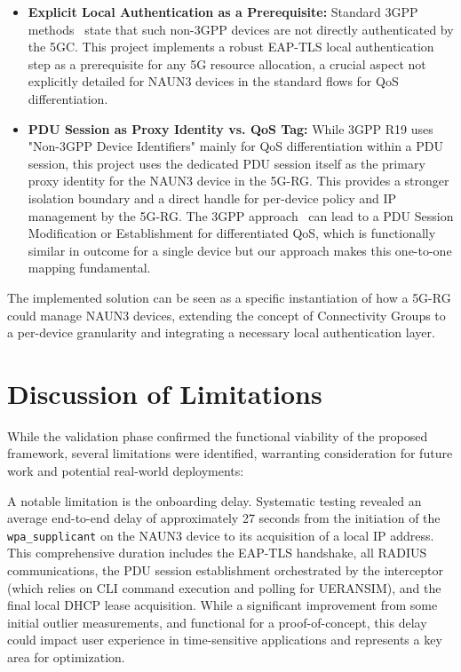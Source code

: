 \begin{itemize}
    \item \textbf{Explicit Local Authentication as a Prerequisite:} Standard \ac{3GPP} methods~\cite{23.501-p564} state that such non-\ac{3GPP} devices are not directly authenticated by the \ac{5GC}. This project implements a robust \ac{EAP-TLS} local authentication step as a prerequisite for any \ac{5G} resource allocation, a crucial aspect not explicitly detailed for \ac{NAUN3} devices in the standard flows for \ac{QoS} differentiation.

    \item \textbf{PDU Session as Proxy Identity vs. QoS Tag:} While \ac{3GPP} R19 uses "Non-\ac{3GPP} Device Identifiers" mainly for \ac{QoS} differentiation within a \ac{PDU} session, this project uses the dedicated \ac{PDU} session itself as the primary proxy identity for the \ac{NAUN3} device in the \ac{5G-RG}. This provides a stronger isolation boundary and a direct handle for per-device policy and \ac{IP} management by the \ac{5G-RG}. The \ac{3GPP} approach~\cite{23.316-p95} can lead to a \ac{PDU} Session Modification or Establishment for differentiated \ac{QoS}, which is functionally similar in outcome for a single device but our approach makes this one-to-one mapping fundamental.
\end{itemize}

The implemented solution can be seen as a specific instantiation of how a \ac{5G-RG} could manage \ac{NAUN3} devices, extending the concept of Connectivity Groups to a per-device granularity and integrating a necessary local authentication layer.

\section{Discussion of Limitations}

While the validation phase confirmed the functional viability of the proposed framework, several limitations were identified, warranting consideration for future work and potential real-world deployments:

A notable limitation is the onboarding delay. Systematic testing revealed an average end-to-end delay of approximately 27 seconds from the initiation of the \texttt{wpa\_supplicant} on the \ac{NAUN3} device to its acquisition of a local \ac{IP} address. This comprehensive duration includes the \ac{EAP-TLS} handshake, all \ac{RADIUS} communications, the \ac{PDU} session establishment orchestrated by the interceptor (which relies on \ac{CLI} command execution and polling for UERANSIM), and the final local \ac{DHCP} lease acquisition. While a significant improvement from some initial outlier measurements, and functional for a proof-of-concept, this delay could impact user experience in time-sensitive applications and represents a key area for optimization.


